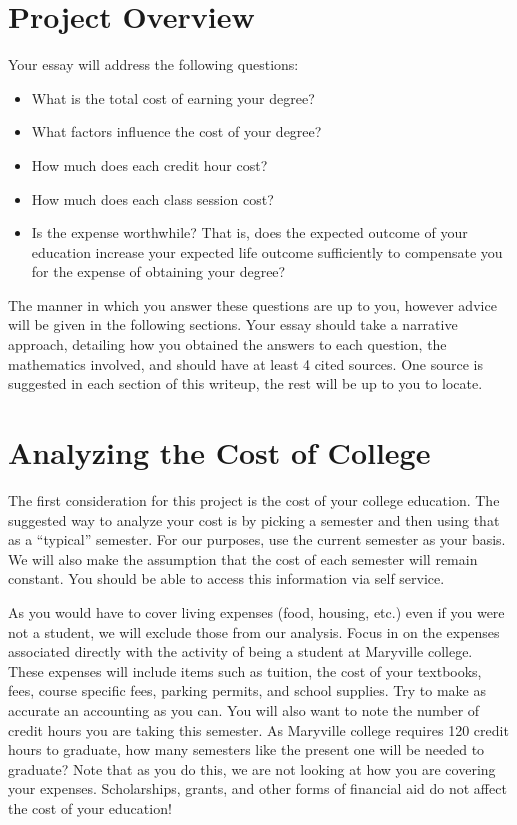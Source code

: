 \documentclass{article}
\begin{document}
\section*{Project Overview}
Your essay will address the following questions:
\begin{itemize}
\item What is the total cost of earning your degree?
\item What factors influence the cost of your degree?
\item How much does each credit hour cost?
\item How much does each class session cost?
\item Is the expense worthwhile?  That is, does the expected outcome of your education increase your expected life outcome sufficiently to compensate you for the expense of obtaining your degree?
\end{itemize}

The manner in which you answer these questions are up to you, however advice will be given in the following sections.  Your essay should take a narrative
approach, detailing how you obtained the answers to each question, the mathematics involved, and should have at least 4 cited sources.  One source is suggested in each section of this writeup, the rest will be up to you to locate.

\section*{Analyzing the Cost of College}
The first consideration for this project is the cost of your college education.  The suggested way to analyze your cost is by picking a semester and then using that as a ``typical'' semester.  For our purposes, use the current semester as your basis.  We will also make the assumption that the cost of each semester will remain constant.  You should be able to access this information via self service.  

As you would have to cover living expenses (food, housing, etc.) even if you were not a student, we will exclude those from our analysis.  Focus in on the expenses associated directly with the activity of being a student at Maryville college.  These expenses will include items such as tuition, the cost of your textbooks, fees, course specific fees, parking permits, and school supplies.  Try to make as accurate an accounting as you can.  You will also want to note the number of credit hours you are taking this semester.  As Maryville college requires 120 credit hours to graduate, how many semesters like the present one will be needed to graduate?  Note that as you do this, we are not looking at how you are covering your expenses.  Scholarships, grants, and other forms of financial aid do not affect the cost of your education!
\end{document}
